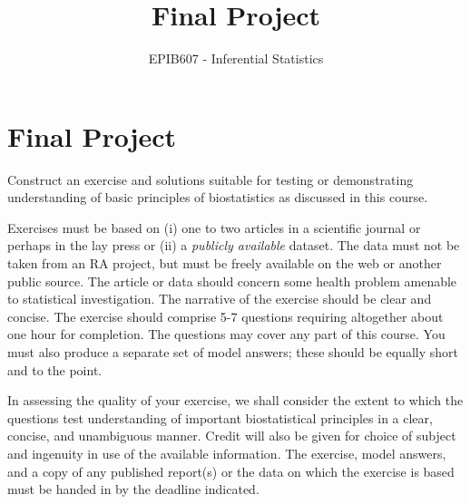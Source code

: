 \documentclass[letterpaper,12pt,twoside,]{pinp}
\title{Final Project}
\author[a]{EPIB607 - Inferential Statistics}
\affil[a]{Fall 2020, McGill University}
\begin{document}
\verticaladjustment{-2pt}

\maketitle
\thispagestyle{firststyle}



\hypertarget{final-project}{%
\section{Final Project}\label{final-project}}

Construct an exercise and solutions suitable for testing or
demonstrating understanding of basic principles of biostatistics as
discussed in this course.

\vspace*{.3in}

Exercises must be based on (i) one to two articles in a scientific
journal or perhaps in the lay press or (ii) a
\textit{publicly available} dataset. The data must not be taken from an
RA project, but must be freely available on the web or another public
source. The article or data should concern some health problem amenable
to statistical investigation. The narrative of the exercise should be
clear and concise. The exercise should comprise 5-7 questions requiring
altogether about one hour for completion. The questions may cover any
part of this course. You must also produce a separate set of model
answers; these should be equally short and to the point.

\vspace*{.3in}

In assessing the quality of your exercise, we shall consider the extent
to which the questions test understanding of important biostatistical
principles in a clear, concise, and unambiguous manner. Credit will also
be given for choice of subject and ingenuity in use of the available
information. The exercise, model answers, and a copy of any published
report(s) or the data on which the exercise is based must be handed in
by the deadline indicated.
\end{document}
